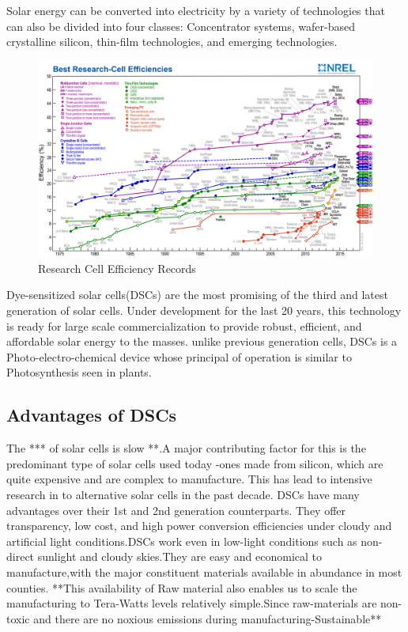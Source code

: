   Solar energy can be converted into electricity by a variety of technologies that can also be divided into four classes: Concentrator systems, wafer-based crystalline silicon, thin-film technologies, and emerging technologies\cite{wenger2010strategies}.\\
  
    \begin{figure}[H]
    \begin{center}
    \includegraphics[width=\textwidth]{images/efficiency_chart.jpg}
    \caption{Research Cell Efficiency Records \cite{nrel_Research_Cell} }
    \label{fig:Cell_eficency}
    \end{center}
    \end{figure}
  
  Dye-sensitized solar cells(\ac{DSCs}) are the most promising of the third and latest generation of solar cells. Under development for the last 20 years, this technology is ready for large scale commercialization to provide robust, efficient, and affordable solar energy to the masses. unlike previous generation cells, \ac{DSCs} is a Photo-electro-chemical device whose principal of operation is similar to Photosynthesis seen in plants.\\

 \subsection{Advantages of DSCs }
  
  The *** of solar cells is slow **.A major contributing factor for this is the predominant type of solar cells used today -ones made from silicon, which are quite expensive and are complex to manufacture. This has lead to intensive research in to alternative solar cells in the past decade. \ac{DSCs} have many advantages over their 1st and 2nd generation counterparts. They offer transparency, low cost, and high power conversion efficiencies under cloudy and artificial light conditions.\ac{DSCs} work even in low-light conditions such as non-direct sunlight and cloudy skies.They are easy and economical to manufacture,with the major constituent materials available in abundance in most counties. **This availability of Raw material also enables us to scale the manufacturing to Tera-Watts levels relatively simple.Since raw-materials are non-toxic and there are no noxious emissions during manufacturing-Sustainable**\\
  
